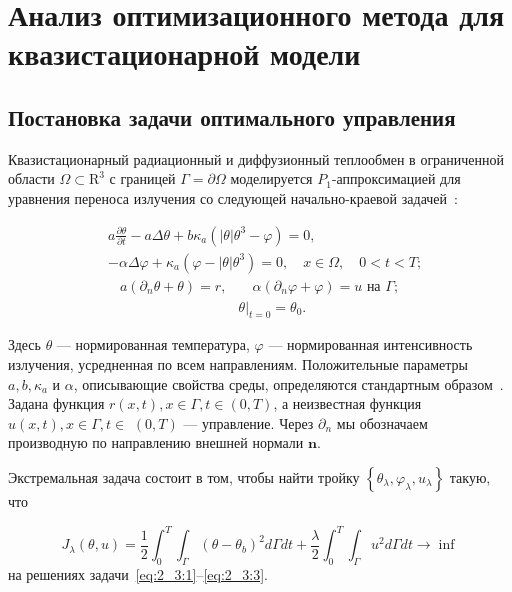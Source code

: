 \section{Анализ оптимизационного метода для квазистационарной модели}
\label{sec:ch2/sec3}

\subsection{Постановка задачи оптимального управления}
\label{subsec:ch2/sec3/state}
Квазистационарный радиационный и диффузионный теплообмен в ограниченной области
$\Omega \subset \mathrm{R}^{3}$ с границей $\Gamma=\partial \Omega$ моделируется
$P_{1}$-аппроксимацией для уравнения переноса излучения
со следующей начально-краевой задачей~\cite{Grenkin2016a, Pinnau2007}:

\begin{equation}
    \label{eq:2_3:1}
    \begin{split}
        & a \frac{\partial \theta}{\partial t}-a \Delta \theta
        + b \kappa_{a}\left(|\theta| \theta^{3}-\varphi\right)=0, \\
        &-\alpha \Delta \varphi+\kappa_{a}\left(\varphi-|\theta| \theta^{3}\right)=0,
        \quad x \in \Omega, \quad 0<t<T;
    \end{split}
\end{equation}
\begin{align}
    a\left(\partial_{n} \theta+\theta\right)=r,
    &\quad \alpha\left(\partial_{n} \varphi
    + \varphi\right)=u \text { на } \Gamma;  \label{eq:2_3:2}\\
    &\left.\theta\right|_{t=0}=\theta_{0}. \label{eq:2_3:3}
\end{align}

Здесь $\theta$ — нормированная температура,
$\varphi$ — нормированная интенсивность излучения,
усредненная по всем направлениям.
Положительные параметры $a, b, \kappa_{a}$ и $\alpha$,
описывающие свойства среды,
определяются стандартным образом~\cite{Kovtanyuk2015}.
Задана функция $r(x, t), x \in \Gamma, t \in(0, T)$,
а неизвестная функция $u(x, t), x \in \Gamma, t \in$ $(0, T)$ — управление.
Через $\partial_{n}$ мы обозначаем производную
по направлению внешней нормали $\mathbf{n}$.


Экстремальная задача состоит в том, чтобы найти тройку
$\left\{\theta_{\lambda}, \varphi_{\lambda}, u_{\lambda}\right\}$ такую, что

\begin{equation}
    \label{eq:2_3:4}
    J_{\lambda}(\theta, u)=\frac{1}{2} \int_{0}^{T}
    \int_{\Gamma}\left(\theta-\theta_{b}\right)^{2} d \Gamma d t+\frac{\lambda}{2}
    \int_{0}^{T} \int_{\Gamma} u^{2} d \Gamma d t \rightarrow \inf
\end{equation}
на решениях задачи~\eqref{eq:2_3:1}--\eqref{eq:2_3:3}.


